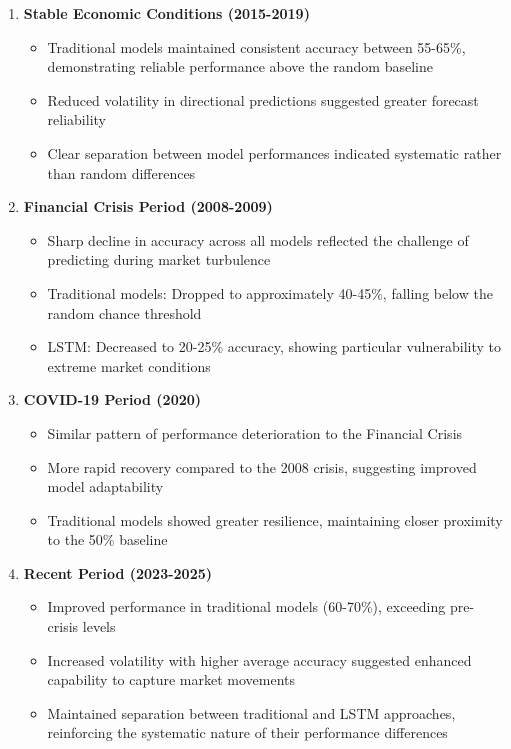\documentclass[12pt,a4paper]{report}
\begin{document}
\begin{enumerate}
    \item \textbf{Stable Economic Conditions (2015-2019)}
    \begin{itemize}
        \item Traditional models maintained consistent accuracy between 55-65\%, demonstrating reliable performance above the random baseline
        \item Reduced volatility in directional predictions suggested greater forecast reliability
        \item Clear separation between model performances indicated systematic rather than random differences
    \end{itemize}

    \item \textbf{Financial Crisis Period (2008-2009)}
    \begin{itemize}
        \item Sharp decline in accuracy across all models reflected the challenge of predicting during market turbulence
        \item Traditional models: Dropped to approximately 40-45\%, falling below the random chance threshold
        \item LSTM: Decreased to 20-25\% accuracy, showing particular vulnerability to extreme market conditions
    \end{itemize}

    \item \textbf{COVID-19 Period (2020)}
    \begin{itemize}
        \item Similar pattern of performance deterioration to the Financial Crisis
        \item More rapid recovery compared to the 2008 crisis, suggesting improved model adaptability
        \item Traditional models showed greater resilience, maintaining closer proximity to the 50\% baseline
    \end{itemize}

    \item \textbf{Recent Period (2023-2025)}
    \begin{itemize}
        \item Improved performance in traditional models (60-70\%), exceeding pre-crisis levels
        \item Increased volatility with higher average accuracy suggested enhanced capability to capture market movements
        \item Maintained separation between traditional and LSTM approaches, reinforcing the systematic nature of their performance differences
    \end{itemize}
\end{enumerate}
\end{document}
